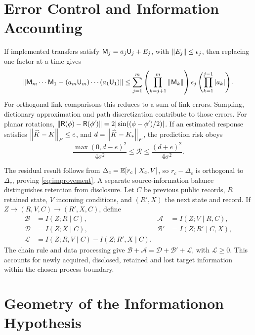 \section{Error Control and Information Accounting}
\label{app:errors}
If implemented transfers satisfy \(\mathsf M_j=a_j\mathsf U_j+E_j\), with \(\left\lVert E_j\right\rVert\le\epsilon_j\), then replacing one factor at a time gives
\begin{equation*}
\left\lVert\mathsf M_m\cdots\mathsf M_1-(a_m\mathsf U_m)\cdots(a_1\mathsf U_1)\right\rVert
\le\sum_{j=1}^m\left(\prod_{k=j+1}^m\left\lVert\mathsf M_k\right\rVert\right)\epsilon_j
\left(\prod_{k=1}^{j-1}|a_k|\right).
\end{equation*}
For orthogonal link comparisons this reduces to a sum of link errors. Sampling, dictionary approximation and path discretization contribute to those errors. For planar rotations,
\(\left\lVert\mathsf R(\phi)-\mathsf R(\phi')\right\rVert=2|\sin((\phi-\phi')/2)|\).
If an estimated response satisfies \(\left\lVert\widehat K-K\right\rVert_F\le e\), and \(d=\left\lVert\widehat K-K_*\right\rVert_F\), the prediction risk obeys
\begin{equation*}
\frac{\max(0,d-e)^2}{4\sigma^2}\le\mathcal R\le\frac{(d+e)^2}{4\sigma^2}.
\end{equation*}

The residual result follows from \(\Delta_c=\mathbb E[r_c\mid X_c,V]\), so \(r_c-\Delta_c\) is orthogonal to \(\Delta_c\), proving \cref{eq:improvement}. A separate source-information balance distinguishes retention from disclosure. Let \(C\) be previous public records, \(R\) retained state, \(V\) incoming conditions, and \((R',X)\) the next state and record. If \(Z\to(R,V,C)\to(R',X,C)\), define
\begin{align*}
\mathcal B&=I(Z;R\mid C),&\mathcal A&=I(Z;V\mid R,C),\\
\mathcal D&=I(Z;X\mid C),&\mathcal B'&=I(Z;R'\mid C,X),\\
\mathcal L&=I(Z;R,V\mid C)-I(Z;R',X\mid C).&&
\end{align*}
The chain rule and data processing give \(\mathcal B+\mathcal A=\mathcal D+\mathcal B'+\mathcal L\), with \(\mathcal L\ge0\). This accounts for newly acquired, disclosed, retained and lost target information within the chosen process boundary.

\section{Geometry of the Informationon Hypothesis}
\label{app:physical}
